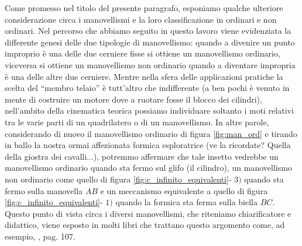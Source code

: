 \noindent Come promesso nel titolo del presente paragrafo, esponiamo
qualche ulteriore considerazione circa i manovellismi e la loro classificazione
in ordinari e non ordinari. Nel percorso che abbiamo seguito in questo lavoro
viene evidenziata la differente genesi delle due tipologie di manovellismo:
quando a divenire un punto improprio \`e una delle due cerniere fisse
si ottiene un manovellismo ordinario, viceversa
si ottiene un manovellismo non ordinario quando a diventare impropria \`e
una delle altre due cerniere.  Mentre nella sfera delle applicazioni
pratiche la scelta del ``membro telaio'' \`e tutt'altro che indifferente (a
ben pochi \`e venuto in mente di costruire un motore dove a ruotare fosse
il blocco dei cilindri),
nell'ambito della cinematica teorica possiamo individuare soltanto
i moti relativi tra
le varie parti di un quadrilatero o di un manovellismo. In altre parole,
considerando di nuovo il manovellismo ordinario di figura \ref{fig:man_ord}
e tirando in ballo la nostra ormai affezionata formica esploratrice
(ve la ricordate? Quella della giostra dei cavalli...), potremmo
affermare che tale insetto vedrebbe un manovellismo ordinario quando
sta fermo sul glifo (il cilindro), un manovellismo non ordinario 
come quello di figura \ref{fig:c_infinito_equivalenti}- $3)$ quando
sta fermo sulla manovella $AB$ e un meccanismo equivalente a quello di
figura  \ref{fig:c_infinito_equivalenti}- $1)$ quando la formica sta ferma 
sulla biella $BC$. 
Questo punto di vista circa i diversi manovellismi,
che riteniamo chiarificatore e
didattico, viene esposto in molti libri che trattano questo argomento come,
ad esempio, \cite{sesini1}, pag. 107.
\endinput 
